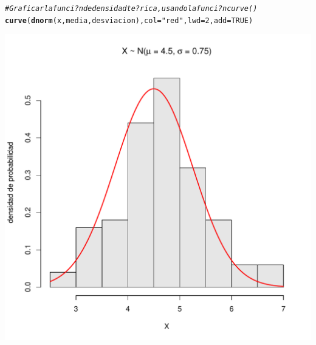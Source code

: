 \documentclass[10pt,a4paper]{article}\usepackage[]{graphicx}\usepackage[]{color}
\makeatletter
\def\maxwidth{ %
  \ifdim\Gin@nat@width>\linewidth
    \linewidth
  \else
    \Gin@nat@width
  \fi
}
\newcommand{\hlnum}[1]{\textcolor[rgb]{0.686,0.059,0.569}{#1}}%
\newcommand{\hlstr}[1]{\textcolor[rgb]{0.192,0.494,0.8}{#1}}%
\newcommand{\hlcom}[1]{\textcolor[rgb]{0.678,0.584,0.686}{\textit{#1}}}%
\newcommand{\hlstd}[1]{\textcolor[rgb]{0.345,0.345,0.345}{#1}}%
\newcommand{\hlkwc}[1]{\textcolor[rgb]{0.333,0.667,0.333}{#1}}%
\newcommand{\hlkwd}[1]{\textcolor[rgb]{0.737,0.353,0.396}{\textbf{#1}}}%
\newenvironment{kframe}{%
 \def\at@end@of@kframe{}%
 \ifinner\ifhmode%
  \def\at@end@of@kframe{\end{minipage}}%
  \begin{minipage}{\columnwidth}%
 \fi\fi%
 \def\FrameCommand##1{\hskip\@totalleftmargin \hskip-\fboxsep
 \colorbox{shadecolor}{##1}\hskip-\fboxsep
     \hskip-\linewidth \hskip-\@totalleftmargin \hskip\columnwidth}%
 \MakeFramed {\advance\hsize-\width
   \@totalleftmargin\z@ \linewidth\hsize
   \@setminipage}}%
 {\par\unskip\endMakeFramed%
 \at@end@of@kframe}
\newenvironment{knitrout}{}{} %
\makeatother
\begin{document}
\begin{knitrout}
\begin{kframe}
\begin{alltt}
\hlcom{# Graficar la funci?n de densidad te?rica, usando la funci?n curve() }
\hlkwd{curve}\hlstd{(}\hlkwd{dnorm}\hlstd{(x, media, desviacion),} \hlkwc{col}\hlstd{=}\hlstr{"red"}\hlstd{,} \hlkwc{lwd}\hlstd{=}\hlnum{2}\hlstd{,} \hlkwc{add}\hlstd{=}\hlnum{TRUE}\hlstd{)}
\end{alltt}
\end{kframe}
\includegraphics[width=\maxwidth]{figure/unnamed-chunk-6-1} 

\end{knitrout}
\end{document}
